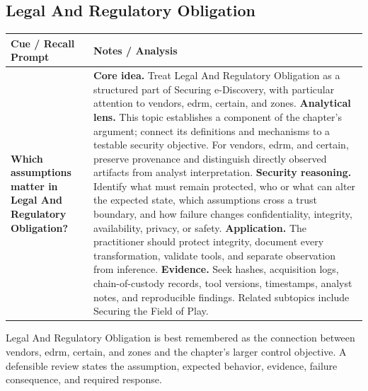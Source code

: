 \documentclass[11pt]{article}
\newcommand{\CornellHeader}{%
\rowcolor{Navy}\color{white}\bfseries Cue / Recall Prompt & \color{white}\bfseries Notes / Analysis\\\hline}
\newcommand{\CornellRow}[2]{%
\cellcolor{CueGray}\RaggedRight\textbf{#1} & \RaggedRight #2\\\hline}
\begin{document}
\subsection*{Legal And Regulatory Obligation}
\begin{longtable}{>{\RaggedRight\arraybackslash}p{}|>{\RaggedRight\arraybackslash}p{}}
\CornellHeader
\CornellRow{Which assumptions matter in Legal And Regulatory Obligation?}{\textbf{Core idea.} Treat Legal And Regulatory Obligation as a structured part of Securing e-Discovery, with particular attention to vendors, edrm, certain, and zones. \textbf{Analytical lens.} This topic establishes a component of the chapter's argument; connect its definitions and mechanisms to a testable security objective. For vendors, edrm, and certain, preserve provenance and distinguish directly observed artifacts from analyst interpretation. \textbf{Security reasoning.} Identify what must remain protected, who or what can alter the expected state, which assumptions cross a trust boundary, and how failure changes confidentiality, integrity, availability, privacy, or safety. \textbf{Application.} The practitioner should protect integrity, document every transformation, validate tools, and separate observation from inference. \textbf{Evidence.} Seek hashes, acquisition logs, chain-of-custody records, tool versions, timestamps, analyst notes, and reproducible findings. Related subtopics include Securing the Field of Play.}
\end{longtable}
\begin{topicsummary}
Legal And Regulatory Obligation is best remembered as the connection between vendors, edrm, certain, and zones and the chapter's larger control objective. A defensible review states the assumption, expected behavior, evidence, failure consequence, and required response.
\end{topicsummary}
\end{document}

